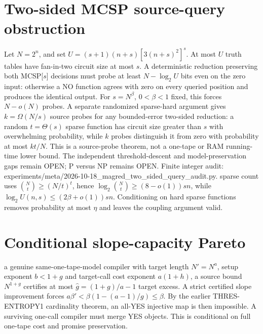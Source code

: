 \documentclass{article}
\begin{document}
\section*{Two-sided MCSP source-query obstruction}
Let $N=2^n$, and set $U=(s+1)(n+s)[3(n+s)^2]^s$. At most $U$ truth tables have fan-in-two circuit size at most $s$. A deterministic reduction preserving both MCSP[$s$] decisions must probe at least $N-\log_2 U$ bits even on the zero input: otherwise a NO function agrees with zero on every queried position and produces the identical output. For $s=N^\beta$, $0<\beta<1$ fixed, this forces $N-o(N)$ probes.
A separate randomized sparse-hard argument gives $k=\Omega(N/s)$ source probes for any bounded-error two-sided reduction: a random $t=\Theta(s)$ sparse function has circuit size greater than $s$ with overwhelming probability, while $k$ probes distinguish it from zero with probability at most $kt/N$. This is a source-probe theorem, not a one-tape or RAM running-time lower bound. The independent threshold-descent and model-preservation gaps remain OPEN; P versus NP remains OPEN. Finite integer audit: experiments/meta/2026-10-18_magred_two_sided_query_audit.py.
\nThe sparse count uses $\binom Nt\ge(N/t)^t$, hence $\log_2\binom Nt\ge(8-o(1))sn$, while $\log_2U(n,s)\le(2\beta+o(1))sn$. Conditioning on hard sparse functions removes probability at most $\eta$ and leaves the coupling argument valid.\n\n\section*{Conditional slope-capacity Pareto}\nFor a genuine same-one-tape-model compiler with target length $N'=N^a$, setup exponent $b<1+g$ and target-call cost exponent $a(1+h)$, a source bound $N^{1+g}$ certifies at most $\widehat g=(1+g)/a-1$ target excess. A strict certified slope improvement forces $a\beta'<\beta(1-(a-1)/g)\le\beta$. By the earlier THRES-ENTROPY1 cardinality theorem, an all-YES injective map is then impossible. A surviving one-call compiler must merge YES objects. This is conditional on full one-tape cost and promise preservation.\n
\end{document}
